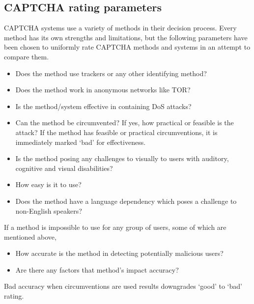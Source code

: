 \subsection{CAPTCHA rating parameters}
CAPTCHA systems use a variety of methods in their decision process. Every method
has its own strengths and limitations, but the following parameters have been
chosen to uniformly rate CAPTCHA methods and systems in an attempt to compare
them.

\begin{description}
\item[Privacy] 
	\begin{itemize}
		\item Does the method use trackers or any other identifying method?
		\item Does the method work in anonymous networks like TOR?\
	\end{itemize}
\item[Effectiveness]
	\begin{itemize}
		\item Is the method/system effective in containing DoS attacks? 
		\item Can the method be circumvented? If yes, how practical or feasible
			is the attack? If the method has feasible or practical
			circumventions, it is immediately marked `bad' for effectiveness.
	\end{itemize}
\item[Accessibility]
	\begin{itemize}
		\item Is the method posing any challenges to visually to users
			with auditory, cognitive and visual disabilities? 
		\item How easy is it to use?
		\item Does the method have a language dependency which poses a challenge to
		non-English speakers?
	\end{itemize}
	If a method is impossible to use for any group of users, some of which are
	mentioned above, 
\item[Accuracy]
	\begin{itemize}
		\item How accurate is the method in detecting potentially malicious
			users?
		\item Are there any factors that method's impact accuracy?
	\end{itemize}
	Bad accuracy when circumventions are used results downgrades `good' to `bad'
	rating.
\end{description}
